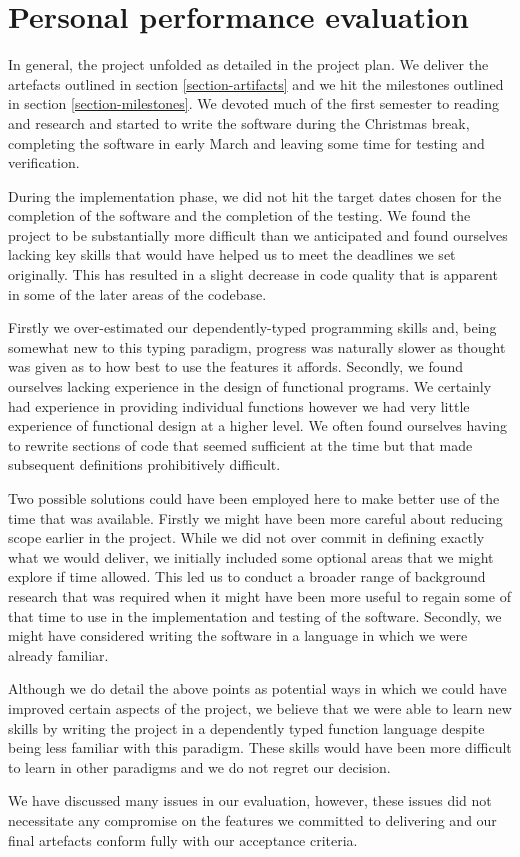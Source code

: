\section{Personal performance evaluation}

In general, the project unfolded as detailed in the project plan. We
deliver the artefacts outlined in section \ref{section-artifacts} and we
hit the milestones outlined in section \ref{section-milestones}. We
devoted much of the first semester to reading and research and started
to write the software during the Christmas break, completing the
software in early March and leaving some time for testing and verification.

During the implementation phase, we did not hit the target
dates chosen for the completion of the software and the completion of
the testing. We found the project to be substantially more difficult
than we anticipated and found ourselves lacking key skills that would
have helped us to meet the deadlines we set originally. This has
resulted in a slight decrease in code quality that is apparent in some
of the later areas of the codebase.

Firstly we over-estimated our dependently-typed programming skills and,
being somewhat new to this typing paradigm, progress was naturally
slower as thought was given as to how best to use the features it
affords. Secondly, we found ourselves lacking experience in the design
of functional programs. We certainly had experience in providing
individual functions however we had very little experience of
functional design at a higher level. We often found ourselves having
to rewrite sections of code that seemed sufficient at the time but
that made subsequent definitions prohibitively difficult.

Two possible solutions could have been employed here
to make better use of the time that was available. Firstly we
might have been more careful about reducing scope earlier in the
project. While we did not over commit in defining exactly what we
would deliver, we initially included some optional areas that we might
explore if time allowed. This led us to conduct a broader range of
background research that was required when it might have been
more useful to regain some of that time to use in the implementation
and testing of the software. Secondly, we might have considered
writing the software in a language in which we were already familiar.

Although we do detail the above points as potential ways in which we
could have improved certain aspects of the project, we believe that we
were able to learn new skills by writing the project in a
dependently typed function language despite being less familiar with
this paradigm. These skills would have been more difficult to learn
in other paradigms and we do not regret our decision.

We have discussed many issues in our evaluation, however, these issues
did not necessitate any compromise on the features we committed to delivering
and our final artefacts conform fully with our acceptance criteria.
